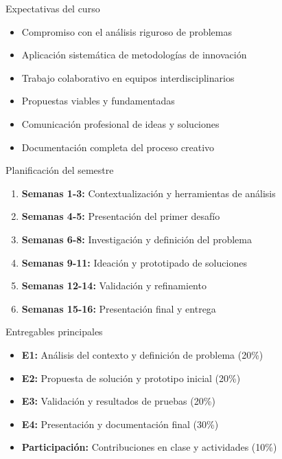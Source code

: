 \documentclass[10pt]{beamer}
\begin{document}
\begin{frame}{Expectativas del curso}
    \begin{itemize}
        \item Compromiso con el análisis riguroso de problemas
        \item Aplicación sistemática de metodologías de innovación
        \item Trabajo colaborativo en equipos interdisciplinarios
        \item Propuestas viables y fundamentadas
        \item Comunicación profesional de ideas y soluciones
        \item Documentación completa del proceso creativo
    \end{itemize}
\end{frame}

\begin{frame}{Planificación del semestre}
    \begin{enumerate}
        \item \textbf{Semanas 1-3:} Contextualización y herramientas de análisis
        \item \textbf{Semanas 4-5:} Presentación del primer desafío
        \item \textbf{Semanas 6-8:} Investigación y definición del problema
        \item \textbf{Semanas 9-11:} Ideación y prototipado de soluciones
        \item \textbf{Semanas 12-14:} Validación y refinamiento
        \item \textbf{Semanas 15-16:} Presentación final y entrega
    \end{enumerate}
\end{frame}

\begin{frame}{Entregables principales}
    \begin{itemize}
        \item \textbf{E1:} Análisis del contexto y definición de problema (20\%)
        \item \textbf{E2:} Propuesta de solución y prototipo inicial (20\%)
        \item \textbf{E3:} Validación y resultados de pruebas (20\%)
        \item \textbf{E4:} Presentación y documentación final (30\%)
        \item \textbf{Participación:} Contribuciones en clase y actividades (10\%)
    \end{itemize}
\end{frame}
\end{document}

